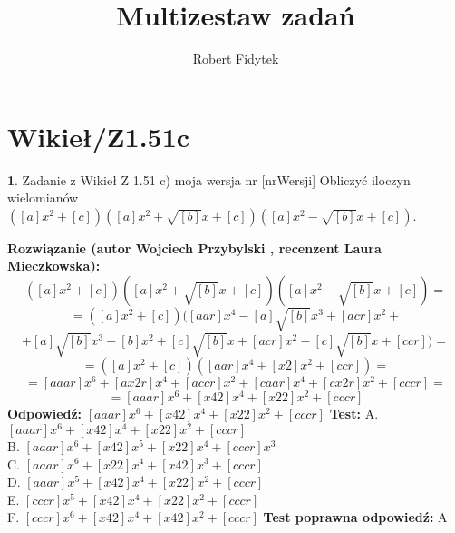 \documentclass[12pt, a4paper]{article}
\title{Multizestaw zadań}
\author{Robert Fidytek}
\date{}
\theoremstyle{definition} %
\newtheorem{zad}{}
\newcommand{\kategoria}[1]{\section{#1}} %
\newcommand{\zadStart}[1]{\begin{zad}#1\newline} %
\newcommand{\zadStop}{\end{zad}}   %
\newcommand{\rozwStart}[2]{\noindent \textbf{Rozwiązanie (autor #1 , recenzent #2): }\newline} %
\newcommand{\rozwStop}{\newline}                                            %
\newcommand{\odpStart}{\noindent \textbf{Odpowiedź:}\newline}    %
\newcommand{\odpStop}{\newline}                                             %
\newcommand{\testStart}{\noindent \textbf{Test:}\newline} %
\newcommand{\testStop}{\newline} %
\newcommand{\kluczStart}{\noindent \textbf{Test poprawna odpowiedź:}\newline} %
\newcommand{\kluczStop}{\newline} %
\begin{document}
\maketitle


\kategoria{Wikieł/Z1.51c}
\zadStart{Zadanie z Wikieł Z 1.51 c) moja wersja nr [nrWersji]}
Obliczyć iloczyn wielomianów $([a]x^{2}+[c])([a]x^{2}+\sqrt{[b]}x+[c])([a]x^{2}-\sqrt{[b]}x+[c])$.
\zadStop
\rozwStart{Wojciech Przybylski}{Laura Mieczkowska}
$$([a]x^{2}+[c])([a]x^{2}+\sqrt{[b]}x+[c])([a]x^{2}-\sqrt{[b]}x+[c])=$$
$$=([a]x^{2}+[c])([aar]x^{4}-[a]\sqrt{[b]}x^{3}+[acr]x^{2}+$$
$$+[a]\sqrt{[b]}x^{3}-[b]x^{2}+[c]\sqrt{[b]}x+[acr]x^{2}-[c]\sqrt{[b]}x+[ccr])=$$
$$=([a]x^{2}+[c])([aar]x^{4}+[x2]x^{2}+[ccr])=$$
$$=[aaar]x^{6}+[ax2r]x^{4}+[accr]x^{2}+[caar]x^{4}+[cx2r]x^{2}+[cccr]=$$
$$=[aaar]x^{6}+[x42]x^{4}+[x22]x^{2}+[cccr]$$
\rozwStop
\odpStart
$[aaar]x^{6}+[x42]x^{4}+[x22]x^{2}+[cccr]$
\odpStop
\testStart
A. $[aaar]x^{6}+[x42]x^{4}+[x22]x^{2}+[cccr]$\\
B. $[aaar]x^{6}+[x42]x^{5}+[x22]x^{4}+[cccr]x^{3}$\\
C. $[aaar]x^{6}+[x22]x^{4}+[x42]x^{3}+[cccr]$\\
D. $[aaar]x^{5}+[x42]x^{4}+[x22]x^{2}+[cccr]$\\
E. $[cccr]x^{5}+[x42]x^{4}+[x22]x^{2}+[cccr]$\\
F. $[cccr]x^{6}+[x42]x^{4}+[x42]x^{2}+[cccr]$
\testStop
\kluczStart
A
\kluczStop
\end{document}
